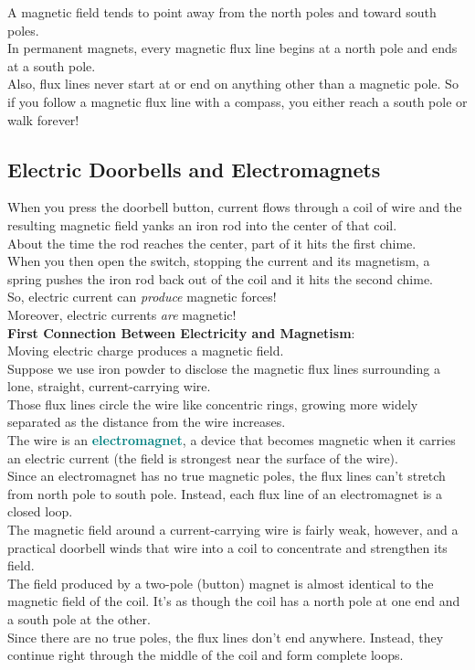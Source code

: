 \documentclass[12pt]{article}
\theoremstyle{definition}
\newcommand{\defnterm}[1]{\textbf{\textcolor{teal}{#1}}\index{#1}}
\begin{document}
A magnetic field tends to point away from the north poles and toward south poles. \\
In permanent magnets, every magnetic flux line begins at a north pole and ends at a south pole. \\
Also, flux lines never start at or end on anything other than a magnetic pole.
So if you follow a magnetic flux line with a compass, you either reach a south pole or walk forever!

\subsection{Electric Doorbells and Electromagnets}
When you press the doorbell button, current flows through a coil of wire and the resulting magnetic field yanks an iron rod into the center of that coil. \\
About the time the rod reaches the center, part of it hits the first chime. \\
When you then open the switch, stopping the current and its magnetism, a spring pushes the iron rod back out of the coil and it hits the second chime. \\

So, electric current can \emph{produce} magnetic forces! \\
Moreover, electric currents \emph{are} magnetic! \\

\textbf{First Connection Between Electricity and Magnetism}: \\
Moving electric charge produces a magnetic field. \\

Suppose we use iron powder to disclose the magnetic flux lines surrounding a lone, straight, current-carrying wire. \\
Those flux lines circle the wire like concentric rings, growing more widely separated as the distance from the wire increases. \\
The wire is an \defnterm{electromagnet}, a device that becomes magnetic when it carries an electric current (the field is strongest near the surface of the wire). \\
Since an electromagnet has no true magnetic poles, the flux lines can't stretch from north pole to south pole.
Instead, each flux line of an electromagnet is a closed loop. \\

The magnetic field around a current-carrying wire is fairly weak, however, and a practical doorbell winds that wire into a coil to concentrate and strengthen its field. \\
The field produced by a two-pole (button) magnet is almost identical to the magnetic field of the coil.
It's as though the coil has a north pole at one end and a south pole at the other. \\
Since there are no true poles, the flux lines don't end anywhere.
Instead, they continue right through the middle of the coil and form complete loops. \\
\end{document}

